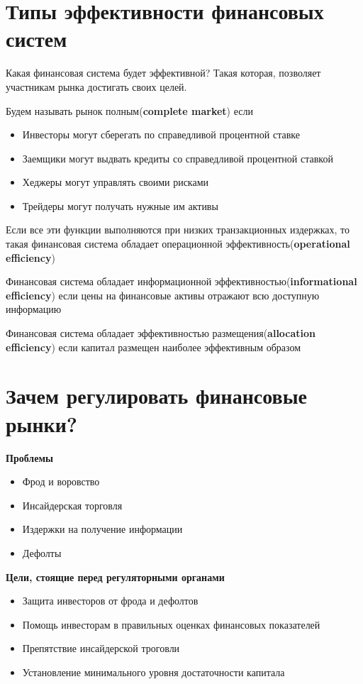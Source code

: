 \documentclass{article}
\begin{document}
 
\section{Типы эффективности финансовых систем}
Какая финансовая система будет эффективной? Такая которая, позволяет участникам рынка достигать своих целей.

Будем называть рынок полным(\textbf{complete market}) если 
\begin{itemize}
    \item Инвесторы могут сберегать по справедливой процентной ставке
    \item Заемщики могут выдвать кредиты со справедливой процентной ставкой
    \item Хеджеры могут управлять своими рисками
    \item Трейдеры могут получать нужные им активы
\end{itemize}
Если все эти функции выполняются при низких транзакционных издержках, то такая финансовая система обладает операционной эффективность(\textbf{operational efficiency})

Финансовая система обладает информационной эффективностью(\textbf{informational efficiency}) если цены на финансовые активы отражают всю доступную информацию

Финансовая система обладает эффективностью размещения(\textbf{allocation efficiency}) если капитал размещен наиболее эффективным образом
\newline
\section{Зачем регулировать финансовые рынки?}
\textbf{Проблемы}
\begin{itemize}
    \item Фрод и воровство
    \item Инсайдерская торговля
    \item Издержки на получение информации
    \item Дефолты
\end{itemize}
 
 \textbf{Цели, стоящие перед регуляторными органами}
 \begin{itemize}
     \item Защита инвесторов от фрода и дефолтов
     \item Помощь инвесторам в правильных оценках финансовых показателей
     \item Препятствие инсайдерской троговли
      \item Установление минимального уровня достаточности капитала
 \end{itemize}
 
\end{document}
